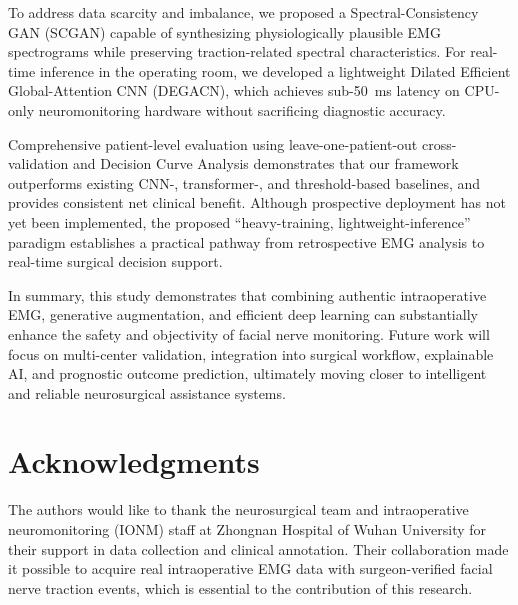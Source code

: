 \documentclass[10pt]{article}
\begin{document}
To address data scarcity and imbalance, we proposed a Spectral-Consistency GAN (SCGAN) capable of synthesizing physiologically plausible EMG spectrograms while preserving traction-related spectral characteristics. For real-time inference in the operating room, we developed a lightweight Dilated Efficient Global-Attention CNN (DEGACN), which achieves sub-\SI{50}{ms} latency on CPU-only neuromonitoring hardware without sacrificing diagnostic accuracy.

Comprehensive patient-level evaluation using leave-one-patient-out cross-validation and Decision Curve Analysis demonstrates that our framework outperforms existing CNN-, transformer-, and threshold-based baselines, and provides consistent net clinical benefit. Although prospective deployment has not yet been implemented, the proposed “heavy-training, lightweight-inference” paradigm establishes a practical pathway from retrospective EMG analysis to real-time surgical decision support.

In summary, this study demonstrates that combining authentic intraoperative EMG, generative augmentation, and efficient deep learning can substantially enhance the safety and objectivity of facial nerve monitoring. Future work will focus on multi-center validation, integration into surgical workflow, explainable AI, and prognostic outcome prediction, ultimately moving closer to intelligent and reliable neurosurgical assistance systems.

\section*{Acknowledgments}
The authors would like to thank the neurosurgical team and intraoperative neuromonitoring (IONM) staff at Zhongnan Hospital of Wuhan University for their support in data collection and clinical annotation. Their collaboration made it possible to acquire real intraoperative EMG data with surgeon-verified facial nerve traction events, which is essential to the contribution of this research.



\end{document}
